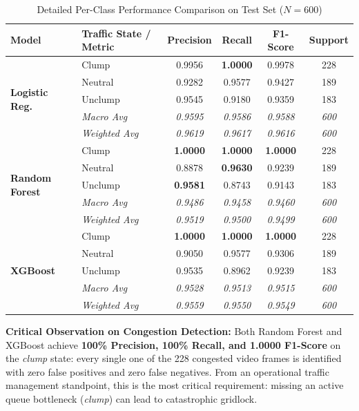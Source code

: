 \documentclass[conference]{IEEEtran}
\begin{document}
\begin{table}[htbp]
\caption{Detailed Per-Class Performance Comparison on Test Set ($N=600$)}
\label{tab:per_class_breakdown}
\centering
\begin{tabular}{llcccc}
\toprule
\textbf{Model} & \textbf{Traffic State / Metric} & \textbf{Precision} & \textbf{Recall} & \textbf{F1-Score} & \textbf{Support} \\
\midrule
\multirow{5}{*}{\textbf{Logistic Reg.}} 
 & Clump          & 0.9956 & \textbf{1.0000} & 0.9978 & 228 \\
 & Neutral        & 0.9282 & 0.9577 & 0.9427 & 189 \\
 & Unclump        & 0.9545 & 0.9180 & 0.9359 & 183 \\
 \cmidrule{2-6}
 & \textit{Macro Avg}    & \textit{0.9595} & \textit{0.9586} & \textit{0.9588} & \textit{600} \\
 & \textit{Weighted Avg} & \textit{0.9619} & \textit{0.9617} & \textit{0.9616} & \textit{600} \\
\midrule
\multirow{5}{*}{\textbf{Random Forest}} 
 & Clump          & \textbf{1.0000} & \textbf{1.0000} & \textbf{1.0000} & 228 \\
 & Neutral        & 0.8878 & \textbf{0.9630} & 0.9239 & 189 \\
 & Unclump        & \textbf{0.9581} & 0.8743 & 0.9143 & 183 \\
 \cmidrule{2-6}
 & \textit{Macro Avg}    & \textit{0.9486} & \textit{0.9458} & \textit{0.9460} & \textit{600} \\
 & \textit{Weighted Avg} & \textit{0.9519} & \textit{0.9500} & \textit{0.9499} & \textit{600} \\
\midrule
\multirow{5}{*}{\textbf{XGBoost}} 
 & Clump          & \textbf{1.0000} & \textbf{1.0000} & \textbf{1.0000} & 228 \\
 & Neutral        & 0.9050 & 0.9577 & 0.9306 & 189 \\
 & Unclump        & 0.9535 & 0.8962 & 0.9239 & 183 \\
 \cmidrule{2-6}
 & \textit{Macro Avg}    & \textit{0.9528} & \textit{0.9513} & \textit{0.9515} & \textit{600} \\
 & \textit{Weighted Avg} & \textit{0.9559} & \textit{0.9550} & \textit{0.9549} & \textit{600} \\
\bottomrule
\end{tabular}
\end{table}

\textbf{Critical Observation on Congestion Detection:} Both Random Forest and XGBoost achieve \textbf{100\% Precision, 100\% Recall, and 1.0000 F1-Score} on the \textit{clump} state: every single one of the 228 congested video frames is identified with zero false positives and zero false negatives. From an operational traffic management standpoint, this is the most critical requirement: missing an active queue bottleneck (\textit{clump}) can lead to catastrophic gridlock.
\end{document}
